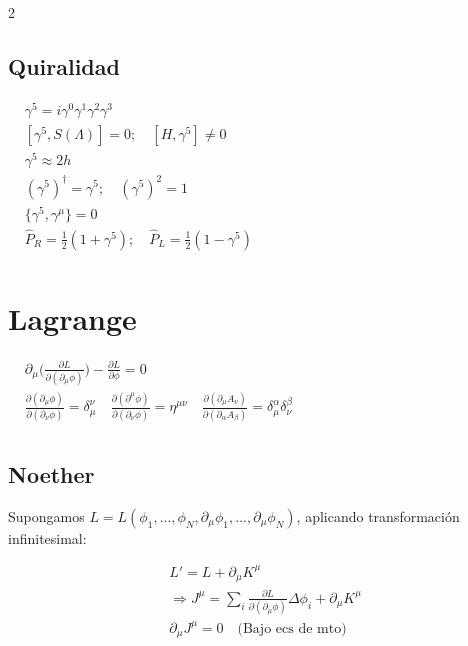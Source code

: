 \documentclass[a4, 12pt]{article}
\begin{document}
\begin{multicols}{2}
    \subsection*{Quiralidad}
    $
    \begin{aligned}
        &\gamma^5 = i\gamma^0 \gamma^1 \gamma^2 \gamma^3 \\
        &[\gamma^5, S(\Lambda)] = 0 ;\quad
        [H, \gamma^5] \neq 0 \\
        &\gamma^5 \approx 2h \\
        &(\gamma^5)^\dagger = \gamma^5 ;\quad
        (\gamma^5)^2 = 1 \\
        &\{\gamma^5, \gamma^\mu\} = 0 \\
        &\hat{P}_R = \frac{1}{2}(1 + \gamma^5) ;\quad
        \hat{P}_L = \frac{1}{2}(1 - \gamma^5) \\
    \end{aligned}
    $

    \section*{Lagrange}
    $
    \begin{aligned}
        &\partial_{\mu}\bigg(\frac{\partial L}{\partial(\partial_\mu\phi)}\bigg) - \frac{\partial L}{\partial \phi} = 0 \\
        &\frac{\partial (\partial_\mu \phi)}{\partial (\partial_\nu \phi)} = \delta^{\nu}_\mu \quad
        \frac{\partial (\partial^\mu \phi)}{\partial (\partial_\nu \phi)} = \eta^{\mu \nu} \quad
        \frac{\partial (\partial_\mu A_{\nu})}{\partial (\partial_\alpha A_\beta)} = \delta^{\alpha}_\mu \delta^\beta_\nu \\
    \end{aligned}
    $

    \subsection*{Noether}
    Supongamos $L = L(\phi_1, ..., \phi_N, \partial_\mu \phi_1, ..., \partial_\mu \phi_N)$, aplicando transformación infinitesimal:

    \begin{equation*}
        \begin{split}
            &L' = L + \partial_\mu K^\mu \\ 
            &\Rightarrow J^\mu = \sum_i \frac{\partial L}{\partial(\partial_\mu\phi)} \Delta \phi_i + \partial_\mu K^\mu \\
            &\partial_\mu J^\mu = 0 \quad \text{(Bajo ecs de mto)}
        \end{split}
    \end{equation*}

\end{multicols}
\end{document}
